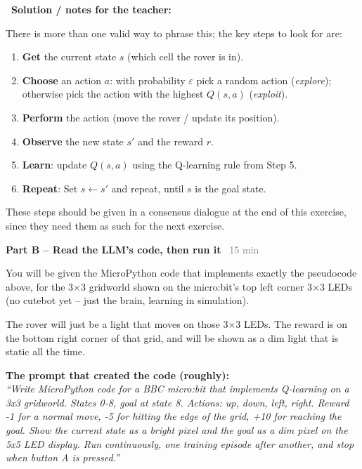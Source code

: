 \documentclass[12pt]{article}
\newcounter{exercise}
\newenvironment{solution}{%
  \begin{solutionbox}\textbf{\faChalkboardTeacher\ Solution / notes for the teacher:}
}{%
  \end{solutionbox}
}
\begin{document}
\begin{solution}
There is more than one valid way to phrase this; the key steps to look for are:
\begin{enumerate}
  \item \textbf{Get} the current state $s$ (which cell the rover is in).
  \item \textbf{Choose} an action $a$: with probability $\varepsilon$ pick a random action (\emph{explore}); otherwise pick the action with the highest $Q(s,a)$ (\emph{exploit}).
  \item \textbf{Perform} the action (move the rover / update its position).
  \item \textbf{Observe} the new state $s'$ and the reward $r$.
  \item \textbf{Learn}: update $Q(s,a)$ using the Q-learning rule from Step 5.
  \item \textbf{Repeat}: Set $s \leftarrow s'$ and repeat, until $s$ is the goal state.
\end{enumerate}

These steps should be given in a consensus dialogue at the end of this exercise, since they need them as such for the next exercise.
\end{solution}

\vspace{0.4cm}
\textbf{Part B -- Read the LLM's code, then run it} \textcolor{gray}{\faClock\ 15 min}

You will be given the MicroPython code that implements exactly the pseudocode above, for the 3$\times$3 gridworld shown on the micro:bit's top left corner 3$\times$3 LEDs (no cutebot yet -- just the brain, learning in simulation). 

The rover will just be a light that moves on those 3$\times$3 LEDs. The reward is on the bottom right corner of that grid, and will be shown as a dim light that is static all the time.

\begin{promptbox}
\textbf{The prompt that created the code (roughly):}\\
\textit{``Write MicroPython code for a BBC micro:bit that implements Q-learning on a 3x3 gridworld. States 0-8, goal at state 8. Actions: up, down, left, right. Reward -1 for a normal move, -5 for hitting the edge of the grid, +10 for reaching the goal. Show the current state as a bright pixel and the goal as a dim pixel on the 5x5 LED display. Run continuously, one training episode after another, and stop when button A is pressed.''}
\end{promptbox}
\end{document}
